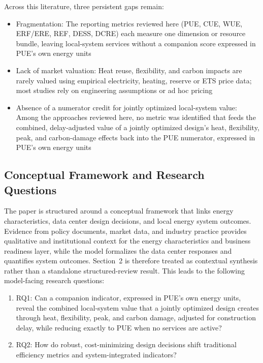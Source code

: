 \documentclass[preprint,12pt]{elsarticle}
\begin{document}
Across this literature, three persistent gaps remain:

\begin{itemize}
\item Fragmentation: The reporting metrics reviewed here (PUE, CUE, WUE, ERF/ERE, REF, DESS, DCRE) each measure one dimension or resource bundle, leaving local-system services without a companion score expressed in PUE's own energy units
\item Lack of market valuation: Heat reuse, flexibility, and carbon impacts are rarely valued using empirical electricity, heating, reserve or ETS price data; most studies rely on engineering assumptions or ad hoc pricing
\item Absence of a numerator credit for jointly optimized local-system value: Among the approaches reviewed here, no metric was identified that feeds the combined, delay-adjusted value of a jointly optimized design's heat, flexibility, peak, and carbon-damage effects back into the PUE numerator, expressed in PUE's own energy units
\end{itemize}

\subsection{Conceptual Framework and Research Questions}
The paper is structured around a conceptual framework that links energy characteristics, data center design decisions, and local energy system outcomes. 
Evidence from policy documents, market data, and industry practice provides qualitative and institutional context for the energy characteristics and business readiness layer, while the model formalizes the data center responses and quantifies system outcomes. Section~2 is therefore treated as contextual synthesis rather than a standalone structured-review result. This leads to the following model-facing research questions:
\begin{enumerate}
\item RQ1: Can a companion indicator, expressed in PUE's own energy units, reveal the combined local-system value that a jointly optimized design creates through heat, flexibility, peak, and carbon damage, adjusted for construction delay, while reducing exactly to PUE when no services are active?
\item RQ2: How do robust, cost-minimizing design decisions shift traditional efficiency metrics and system-integrated indicators?
\end{enumerate}
\end{document}
